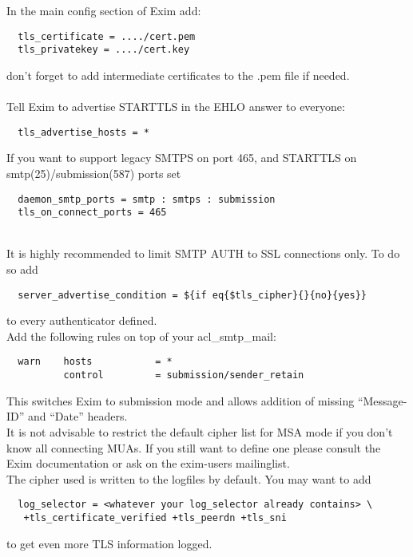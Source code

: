 In the main config section of Exim add:

\begin{lstlisting}
  tls_certificate = ..../cert.pem
  tls_privatekey = ..../cert.key
\end{lstlisting}
don't forget to add intermediate certificates to the .pem file if needed.\\
\\
Tell Exim to advertise STARTTLS in the EHLO answer to everyone:
\begin{lstlisting}
  tls_advertise_hosts = *
\end{lstlisting}

If you want to support legacy SMTPS on port 465, and STARTTLS on smtp(25)/submission(587) ports set
\begin{lstlisting}
  daemon_smtp_ports = smtp : smtps : submission
  tls_on_connect_ports = 465
\end{lstlisting}
\mbox{}\\
It is highly recommended to limit SMTP AUTH to SSL connections only. To do so add
\begin{lstlisting}
  server_advertise_condition = ${if eq{$tls_cipher}{}{no}{yes}}
\end{lstlisting}
to every authenticator defined.\\

Add the following rules on top of your acl\_smtp\_mail:
\begin{lstlisting}
  warn    hosts           = *
          control         = submission/sender_retain
\end{lstlisting}
This switches Exim to submission mode and allows addition of missing ``Message-ID'' and ``Date'' headers.\\

It is not advisable to restrict the default cipher list for MSA mode if you don't know all connecting MUAs. If you still want to define one please consult the Exim documentation or ask on the exim-users mailinglist.\\

The cipher used is written to the logfiles by default. You may want to add
\begin{lstlisting}
  log_selector = <whatever your log_selector already contains> \
   +tls_certificate_verified +tls_peerdn +tls_sni
\end{lstlisting}
to get even more TLS information logged.


